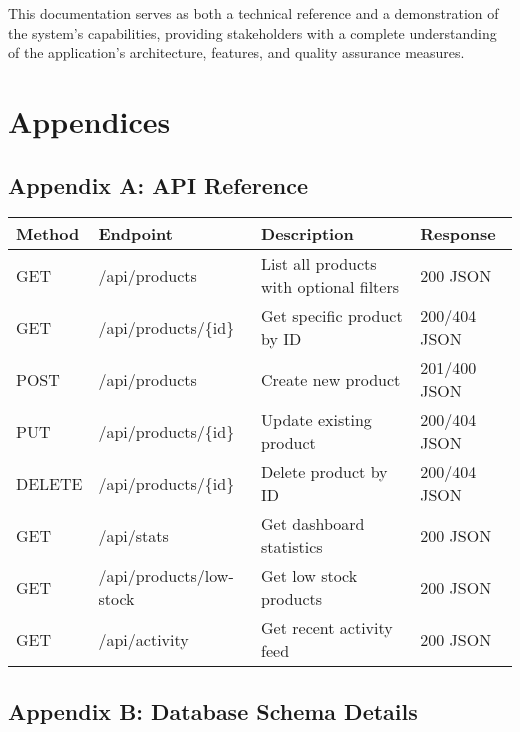 \documentclass[12pt,a4paper]{article}
\begin{document}
This documentation serves as both a technical reference and a demonstration of the system's capabilities, providing stakeholders with a complete understanding of the application's architecture, features, and quality assurance measures.

\newpage

\section{Appendices}

\subsection{Appendix A: API Reference}

\begin{longtable}{|p{2cm}|p{4cm}|p{6cm}|p{2cm}|}
\hline
\textbf{Method} & \textbf{Endpoint} & \textbf{Description} & \textbf{Response} \\
\hline
GET & /api/products & List all products with optional filters & 200 JSON \\
\hline
GET & /api/products/\{id\} & Get specific product by ID & 200/404 JSON \\
\hline
POST & /api/products & Create new product & 201/400 JSON \\
\hline
PUT & /api/products/\{id\} & Update existing product & 200/404 JSON \\
\hline
DELETE & /api/products/\{id\} & Delete product by ID & 200/404 JSON \\
\hline
GET & /api/stats & Get dashboard statistics & 200 JSON \\
\hline
GET & /api/products/low-stock & Get low stock products & 200 JSON \\
\hline
GET & /api/activity & Get recent activity feed & 200 JSON \\
\hline
\end{longtable}

\subsection{Appendix B: Database Schema Details}
\end{document}
